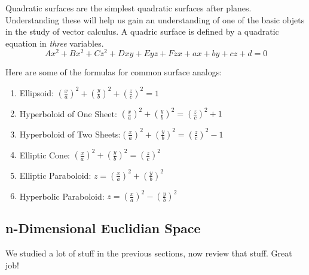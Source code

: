 \documentclass[12pt, letterpaper]{article}
\begin{document}
Quadratic surfaces are the simplest quadratic surfaces after planes. Understanding these will help us gain an understanding of one of the basic objets in the study of vector calculus.
A quadric surface is defined by a quadratic equation in \textit{three} variables. \[Ax^2 + Bx^2 + Cz^2 + Dxy + Eyz + Fzx + ax + by + cz + d = 0\]

Here are some of the formulas for common surface analogs:
\begin{enumerate}
    \item Ellipsoid: \((\frac{x}{a})^2 + (\frac{y}{b})^2 + (\frac{z}{c})^2 = 1\)
    \item Hyperboloid of One Sheet: \((\frac{x}{a})^2 + (\frac{y}{b})^2 = (\frac{z}{c})^2 + 1\)
    \item Hyperboloid of Two Sheets:\((\frac{x}{a})^2 + (\frac{y}{b})^2 = (\frac{z}{c})^2 - 1\)
    \item Elliptic Cone: \((\frac{x}{a})^2 + (\frac{y}{b})^2 = (\frac{z}{c})^2\)
    \item Elliptic Paraboloid: \(z = (\frac{x}{a})^2 + (\frac{y}{b})^2\)
    \item Hyperbolic Paraboloid: \(z = (\frac{x}{a})^2 - (\frac{y}{b})^2\)
\end{enumerate}

\subsection{n-Dimensional Euclidian Space}

We studied a lot of stuff in the previous sections, now review that stuff. Great job!
\end{document}
